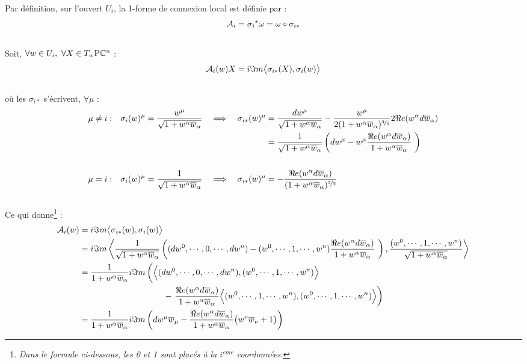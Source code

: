 \begin{annexe}
Par définition, sur l'ouvert $U_i$, la 1-forme de connexion local est définie par :
\[\locconn_i = {\sigma_i}^*\conn = \conn\circ \sigma_{i*}\]
\\
Soit, $\forall w\in U_i,\ \forall X\in\tg[w]{\PC{n}}$ :
\[\locconn_i(w)X= i\Im m \big\langle \sigma_{i*}(X), \sigma_i(w) \big\rangle\]
\\
où les $\sigma_{i*}$ s'écrivent, $\forall \mu$ :
\begin{align*}
	\mu &\neq i : &  \sigma_i(w)^\mu = \frac{w^\mu}{\sqrt{1 + w^\alpha\congu{w}_\alpha}}\quad \Lr\quad
	\sigma_{i*}(w)^\mu &= \frac{dw^\mu}{\sqrt{1 + w^\alpha\congu{w}_\alpha}} - \frac{w^\mu}{2(1 + w^\alpha\congu{w}_\alpha)^{\nicefrac{3}{2}}}2\Re e(w^\alpha d\congu{w}_\alpha) \\
	&  &  &= \frac{1}{\sqrt{1 + w^\alpha\congu{w}_\alpha}}\left(dw^\mu - w^\mu \frac{\Re e(w^\alpha d\congu{w}_\alpha)}{1 + w^\alpha\congu{w}_\alpha}\ \right)
	\\ \\
	\mu &= i :  &  \sigma_i(w)^\mu = \frac{1}{\sqrt{1 + w^\alpha\congu{w}_\alpha}}\quad \Lr\quad
	\sigma_{i*}(w)^\mu &= - \frac{\Re e(w^\alpha d\congu{w}_\alpha)}{(1 + w^\alpha\congu{w}_\alpha)^{\nicefrac{3}{2}}}
\end{align*}
\\
Ce qui donne\footnote{\itshape
	Dans le formule ci-dessous, les 0 et 1 sont placés à la $i^{eme}$ coordonnées.
} :
\begin{align*}
	\locconn_i(w) &= i\Im m \big\langle \sigma_{i*}(w), \sigma_i(w) \big\rangle \\
	&= i\Im m \left\langle \frac{1}{\sqrt{1 + w^\alpha\congu{w}_\alpha}}\left((dw^0,\cdots , 0, \cdots, dw^n) - (w^0,\cdots , 1, \cdots, w^n) \frac{\Re e(w^\alpha d\congu{w}_\alpha)}{1 + w^\alpha\congu{w}_\alpha}\ \right), \frac{(w^0,\cdots , 1, \cdots, w^n)}{\sqrt{1 + w^\alpha\congu{w}_\alpha}} \right\rangle \\
	&= \frac{1}{1 + w^\alpha\congu{w}_\alpha} i\Im m \left( \Big\langle (dw^0,\cdots , 0, \cdots, dw^n), (w^0,\cdots , 1, \cdots, w^n) \Big\rangle \bigg. \right. \\
	&\qquad\qquad\qquad\qquad\qquad - \left.  \frac{\Re e(w^\alpha d\congu{w}_\alpha)}{1 + w^\alpha\congu{w}_\alpha}\Big\langle (w^0,\cdots , 1, \cdots, w^n) , (w^0,\cdots , 1, \cdots, w^n) \Big\rangle \right) \\
	&= \frac{1}{1 + w^\alpha\congu{w}_\alpha} i\Im m \left( dw^\mu\congu{w}_\mu -  \frac{\Re e(w^\alpha d\congu{w}_\alpha)}{1 + w^\alpha\congu{w}_\alpha}\big( w^\nu\congu{w}_\nu +1 \big) \right)

\end{align*}
\end{annexe}
